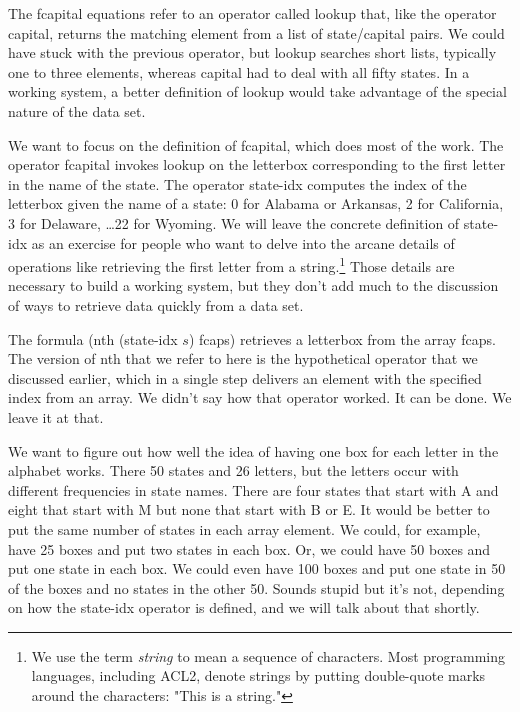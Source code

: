 The \textsf{fcapital} equations refer to an operator
called \textsf{lookup} that, like the operator \textsf{capital},
returns the matching element from a list of state/capital pairs.
We could have stuck with the previous operator,
but \textsf{lookup} searches short lists,
typically one to three elements,
whereas \textsf{capital} had to deal with all fifty states.
In a working system,
a better definition of \textsf{lookup}
would take advantage of the special nature of the data set.

We want to focus on the definition of \textsf{fcapital},
which does most of the work.
The operator \textsf{fcapital} invokes \textsf{lookup}
on the letterbox corresponding to the first letter
in the name of the state.
The operator \textsf{state-idx} computes the index
of the letterbox given the name of a state:
0 for Alabama or Arkansas, 2 for California,
3 for Delaware, \dots 22 for  Wyoming.
We will leave the concrete
definition of \textsf{state-idx} as an exercise for
people who want to delve into the arcane details of
operations like retrieving the first letter from a
string.\footnote{We use the term \emph{string}
to mean a sequence of characters.
Most programming languages, including ACL2,
denote strings by putting double-quote marks
around the characters: \textsf{"This is a string."}}
Those details are necessary to build a working system,
but they don't add much to the discussion of ways
to retrieve data quickly from a data set.

The formula
\textsf{(nth (state-idx $s$) fcaps)}
retrieves a letterbox from the array \textsf{fcaps}.
The version of \textsf{nth} that we refer to here
is the hypothetical operator that we discussed earlier,
which in a single step delivers an element
with the specified index from an array.
We didn't say how that operator worked.
It can be done. We leave it at that.

We want to figure out
how well the idea of having one box for each letter
in the alphabet works.
There 50 states and 26 letters, but the letters occur
with different frequencies in state names.
There are four states that start with A and
eight that start with M
but none that start with B or E.
It would be better to put the same number of states in each
array element. We could, for example, have 25 boxes and put
two states in each box. Or, we could have 50 boxes and put
one state in each box.
We could even have 100 boxes and put one state in 50
of the boxes and no states in the other 50.
Sounds stupid but it's not, depending on how
the \textsf{state-idx} operator is defined,
and we will talk about that shortly.

